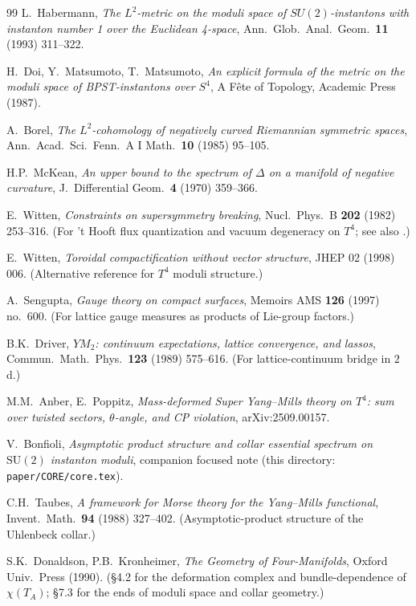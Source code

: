 \documentclass[11pt,letterpaper]{article}
\theoremstyle{definition}
\begin{document}
\begin{thebibliography}{99}
 L.\ Habermann, \emph{The $L^2$-metric on the moduli space of $SU(2)$-instantons with instanton number 1 over the Euclidean 4-space}, Ann.\ Glob.\ Anal.\ Geom.\ \textbf{11} (1993) 311--322.

 H.\ Doi, Y.\ Matsumoto, T.\ Matsumoto, \emph{An explicit formula of the metric on the moduli space of BPST-instantons over $S^4$}, A F\^ete of Topology, Academic Press (1987).

 A.\ Borel, \emph{The $L^2$-cohomology of negatively curved Riemannian symmetric spaces}, Ann.\ Acad.\ Sci.\ Fenn.\ A I Math.\ \textbf{10} (1985) 95--105.

 H.P.\ McKean, \emph{An upper bound to the spectrum of $\Delta$ on a manifold of negative curvature}, J.\ Differential Geom.\ \textbf{4} (1970) 359--366.

 E.\ Witten, \emph{Constraints on supersymmetry breaking}, Nucl.\ Phys.\ B \textbf{202} (1982) 253--316. (For 't Hooft flux quantization and vacuum degeneracy on $T^4$; see also \cite{Witten82-Toron}.)

 E.\ Witten, \emph{Toroidal compactification without vector structure}, JHEP 02 (1998) 006. (Alternative reference for $T^4$ moduli structure.)

 A.\ Sengupta, \emph{Gauge theory on compact surfaces}, Memoirs AMS \textbf{126} (1997) no.\ 600. (For lattice gauge measures as products of Lie-group factors.)

 B.K.\ Driver, \emph{$YM_2$: continuum expectations, lattice convergence, and lassos}, Commun.\ Math.\ Phys.\ \textbf{123} (1989) 575--616. (For lattice-continuum bridge in $2$d.)

 M.M.\ Anber, E.\ Poppitz, \emph{Mass-deformed Super Yang--Mills theory on $T^4$: sum over twisted sectors, $\theta$-angle, and CP violation}, arXiv:2509.00157.

 V.\ Bonfioli, \emph{Asymptotic product structure and collar essential spectrum on $\mathrm{SU}(2)$ instanton moduli}, companion focused note (this directory: \texttt{paper/CORE/core.tex}).

 C.H.\ Taubes, \emph{A framework for Morse theory for the Yang--Mills functional}, Invent.\ Math.\ \textbf{94} (1988) 327--402. (Asymptotic-product structure of the Uhlenbeck collar.)

 S.K.\ Donaldson, P.B.\ Kronheimer, \emph{The Geometry of Four-Manifolds}, Oxford Univ.\ Press (1990). (\S 4.2 for the deformation complex and bundle-dependence of $\chi(T_A)$; \S 7.3 for the ends of moduli space and collar geometry.)


\end{thebibliography}
\end{document}
